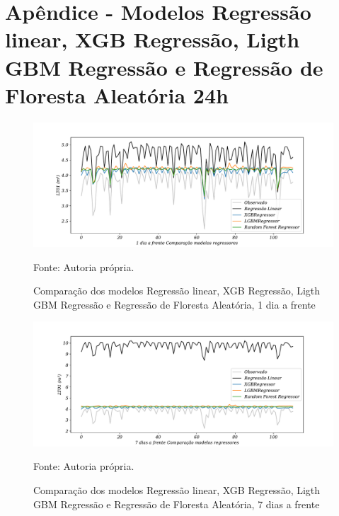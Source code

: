
\section{Ap\^endice - Modelos Regress\~ao linear, XGB Regress\~ao, Ligth GBM Regress\~ao e Regress\~ao de Floresta Aleat\'oria 24h}\label{sec:lrxgblgbmrf24}

\begin{figure}[H]
	\centering
	\caption{Comparação dos modelos Regressão linear, XGB Regressão, Ligth GBM Regressão e Regressão de Floresta Aleatória, 1 dia a frente }
	\label{fig:1-LR-XGB-LGBM-RF24}
	\includegraphics[width=1\linewidth]{Apendices/Figuras/modelagem-24h/1-LR-XGB-LGBM-RF}
	
	Fonte: Autoria própria.
\end{figure}

\begin{figure}[H]
	\centering
	\caption{Comparação dos modelos Regressão linear, XGB Regressão, Ligth GBM Regressão e Regressão de Floresta Aleatória, 7 dias a frente }
	\label{fig:10-LR-XGB-LGBM-RF24}
	\includegraphics[width=1\linewidth]{Apendices/Figuras/modelagem-24h/7-LR-XGB-LGBM-RF}
	
	Fonte: Autoria própria.
\end{figure}


